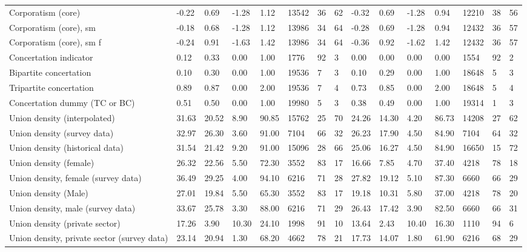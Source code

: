 \begin{longtable}{lllllllllllllll}
Corporatism (core) & -0.22 & 0.69 & -1.28 & 1.12 & 13542 & 36 & 62 & -0.32 & 0.69 & -1.28 & 0.94 & 12210 & 38 & 56\\
\addlinespace
Corporatism (core), sm & -0.18 & 0.68 & -1.28 & 1.12 & 13986 & 34 & 64 & -0.28 & 0.69 & -1.28 & 0.94 & 12432 & 36 & 57\\
Corporatism (core), sm f & -0.24 & 0.91 & -1.63 & 1.42 & 13986 & 34 & 64 & -0.36 & 0.92 & -1.62 & 1.42 & 12432 & 36 & 57\\
Concertation indicator & 0.12 & 0.33 & 0.00 & 1.00 & 1776 & 92 & 3 & 0.00 & 0.00 & 0.00 & 0.00 & 1554 & 92 & 2\\
Bipartite concertation & 0.10 & 0.30 & 0.00 & 1.00 & 19536 & 7 & 3 & 0.10 & 0.29 & 0.00 & 1.00 & 18648 & 5 & 3\\
Tripartite concertation & 0.89 & 0.87 & 0.00 & 2.00 & 19536 & 7 & 4 & 0.73 & 0.85 & 0.00 & 2.00 & 18648 & 5 & 4\\
\addlinespace
Concertation dummy (TC or BC) & 0.51 & 0.50 & 0.00 & 1.00 & 19980 & 5 & 3 & 0.38 & 0.49 & 0.00 & 1.00 & 19314 & 1 & 3\\
Union density (interpolated) & 31.63 & 20.52 & 8.90 & 90.85 & 15762 & 25 & 70 & 24.26 & 14.30 & 4.20 & 86.73 & 14208 & 27 & 62\\
Union density (survey data) & 32.97 & 26.30 & 3.60 & 91.00 & 7104 & 66 & 32 & 26.23 & 17.90 & 4.50 & 84.90 & 7104 & 64 & 32\\
Union density (historical data) & 31.54 & 21.42 & 9.20 & 91.00 & 15096 & 28 & 66 & 25.06 & 16.27 & 4.50 & 84.90 & 16650 & 15 & 72\\
Union density (female) & 26.32 & 22.56 & 5.50 & 72.30 & 3552 & 83 & 17 & 16.66 & 7.85 & 4.70 & 37.40 & 4218 & 78 & 18\\
\addlinespace
Union density, female (survey data) & 36.49 & 29.25 & 4.00 & 94.10 & 6216 & 71 & 28 & 27.82 & 19.12 & 5.10 & 87.30 & 6660 & 66 & 29\\
Union density (Male) & 27.01 & 19.84 & 5.50 & 65.30 & 3552 & 83 & 17 & 19.18 & 10.31 & 5.80 & 37.00 & 4218 & 78 & 20\\
Union density, male (survey data) & 33.67 & 25.78 & 3.30 & 88.00 & 6216 & 71 & 29 & 26.43 & 17.42 & 3.90 & 82.50 & 6660 & 66 & 31\\
Union density (private sector) & 17.26 & 3.90 & 10.30 & 24.10 & 1998 & 91 & 10 & 13.64 & 2.43 & 10.40 & 16.30 & 1110 & 94 & 6\\
Union density, private sector (survey data) & 23.14 & 20.94 & 1.30 & 68.20 & 4662 & 78 & 21 & 17.73 & 14.07 & 1.80 & 61.90 & 6216 & 68 & 29\\

\end{longtable}

